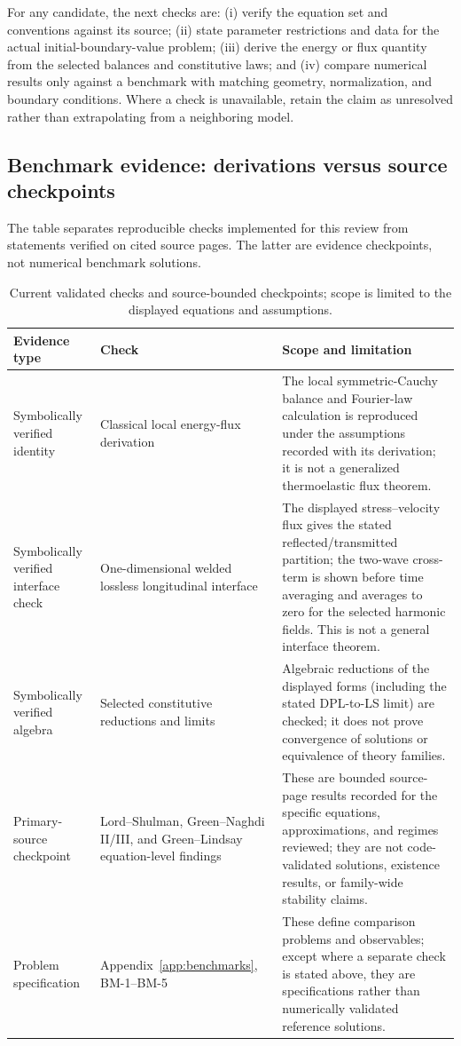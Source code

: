For any candidate, the next checks are: (i) verify the equation set and conventions against its source; (ii) state parameter restrictions and data for the actual initial-boundary-value problem; (iii) derive the energy or flux quantity from the selected balances and constitutive laws; and (iv) compare numerical results only against a benchmark with matching geometry, normalization, and boundary conditions. Where a check is unavailable, retain the claim as unresolved rather than extrapolating from a neighboring model.

\subsection{Benchmark evidence: derivations versus source checkpoints}
\label{sec:benchmark-evidence}

The table separates reproducible checks implemented for this review from statements verified on cited source pages. The latter are evidence checkpoints, not numerical benchmark solutions.

\begin{table}[H]
\centering
\small
\caption{Current validated checks and source-bounded checkpoints; scope is limited to the displayed equations and assumptions.}
\label{tab:validated_checkpoints}
\begin{tabularx}{\textwidth}{@{}p{3.1cm}p{3.2cm}X@{}}
\toprule
\textbf{Evidence type} & \textbf{Check} & \textbf{Scope and limitation} \\
\midrule
Symbolically verified identity & Classical local energy-flux derivation & The local symmetric-Cauchy balance and Fourier-law calculation is reproduced under the assumptions recorded with its derivation; it is not a generalized thermoelastic flux theorem. \\
Symbolically verified interface check & One-dimensional welded lossless longitudinal interface & The displayed stress--velocity flux gives the stated reflected/transmitted partition; the two-wave cross-term is shown before time averaging and averages to zero for the selected harmonic fields. This is not a general interface theorem. \\
Symbolically verified algebra & Selected constitutive reductions and limits & Algebraic reductions of the displayed forms (including the stated DPL-to-LS limit) are checked; it does not prove convergence of solutions or equivalence of theory families. \\
Primary-source checkpoint & Lord--Shulman, Green--Naghdi II/III, and Green--Lindsay equation-level findings & These are bounded source-page results recorded for the specific equations, approximations, and regimes reviewed; they are not code-validated solutions, existence results, or family-wide stability claims. \\
Problem specification & Appendix~\ref{app:benchmarks}, BM-1--BM-5 & These define comparison problems and observables; except where a separate check is stated above, they are specifications rather than numerically validated reference solutions. \\
\bottomrule
\end{tabularx}
\end{table}


